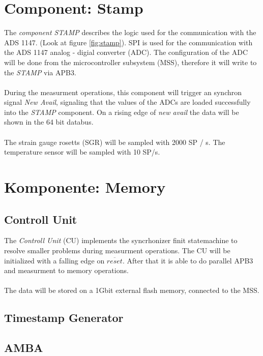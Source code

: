 \section{Component: Stamp}
\label{bes:Stamp}
The \textit{component STAMP} describes the logic used for the communication with the ADS 1147. (Look at figure \ref{fig:stamp}).  
SPI is used for the communication with the ADS 1147 analog - digial converter (ADC). The configuration of the ADC will be done from the microcontroller subsystem (MSS), therefore it will write to the \textit{STAMP} via APB3. \\ \\
During the measurment operations, this component will trigger an synchron signal \textit{New Avail}, signaling that the values of the ADCs are loaded successfully into the \textit{STAMP} component. On a rising edge of \textit{new avail} the data will be shown in the 64 bit databus. \\\\
The strain gauge rosetts (SGR) will be sampled with 2000 SP / s. The temperature sensor will be sampled with 10 SP/s. 
\section{Komponente: Memory}
\label{bes:memory}
\subsection{Controll Unit}
The \textit{Controll Unit} (CU) implements the syncrhonizer finit statemachine to resolve smaller problems during measurment operations. The CU will be initialized with a falling edge on $\overline{reset}$. After that it is able to do parallel APB3 and measurment to memory operations. \\ \\
The data will be stored on a 1Gbit external flash memory, connected to the MSS. 

\subsection{Timestamp Generator}

\subsection{AMBA}
